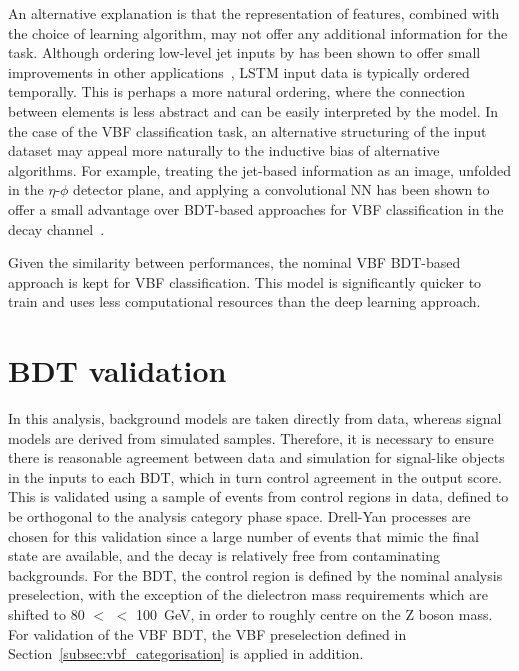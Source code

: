 An alternative explanation is that the representation of features, combined with the choice of learning algorithm, may not offer any additional information for the task. Although ordering low-level jet inputs by \pt has been shown to offer small improvements in other applications~\cite{tthCouplings}, LSTM input data is typically ordered temporally. This is perhaps a more natural ordering, where the connection between elements is less abstract and can be easily interpreted by the model. In the case of the VBF classification task, an alternative structuring of the input dataset may appeal more naturally to the inductive bias of alternative algorithms. For example, treating the jet-based information as an image, unfolded in the $\eta$-$\phi$ detector plane, and applying a convolutional NN has been shown to offer a small advantage over BDT-based approaches for VBF classification in the \Hgg decay channel~\cite{jack_thesis}. 

Given the similarity between performances, the nominal VBF BDT-based approach is kept for VBF classification. This model is significantly quicker to train and uses less computational resources than the deep learning approach.


\section{BDT validation}

In this analysis, background models are taken directly from data, whereas signal models are derived from simulated samples. Therefore, it is necessary to ensure there is reasonable agreement between data and simulation for signal-like objects in the inputs to each BDT, which in turn control agreement in the output score. 
This is validated using a sample of \Zee events from control regions in data, defined to be orthogonal to the analysis category phase space. Drell-Yan processes are chosen for this validation since a large number of events that mimic the \Hee final state are available, and the decay is relatively free from contaminating backgrounds. For the \ggH BDT, the control region is defined by the nominal analysis preselection, with the exception of the dielectron mass requirements which are shifted to 80 $<$ \mee $<$ 100~GeV, in order to roughly centre on the $\mathrm{Z}$ boson mass.
For validation of the VBF BDT, the VBF preselection defined in Section~\ref{subsec:vbf_categorisation} is applied in addition.

